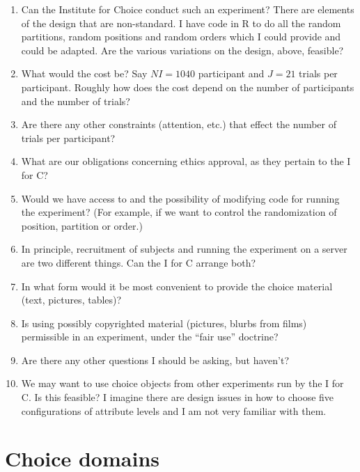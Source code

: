 \documentclass[11pt,letter]{amsart}
\begin{document}
\begin{enumerate}
\item Can the Institute for Choice conduct such an experiment?  There are
elements of the design that are non-standard.  I have code in R to do all
the random partitions, random positions and random orders which I could
provide and could be adapted.  Are the various variations on the design,
above, feasible? 

\item What would the cost be? Say $NI = 1040$ participant and $J=21$ trials
per participant.  Roughly how does the cost depend on the number of
participants and the number of trials? 

\item Are there any other constraints (attention, etc.) that effect the
number of trials per participant? 

\item What are our obligations concerning ethics approval, as they pertain
to the I for C? 

\item Would we have access to and the possibility of modifying code for
running the experiment? (For example, if we want to control the
randomization of position, partition or order.) 

\item In principle, recruitment of subjects and running the experiment on a
server are two different things. Can the I for C arrange both? 

\item In what form would it be most convenient to provide the choice
material (text, pictures, tables)? 

\item Is using possibly copyrighted material (pictures, blurbs from films)
permissible in an experiment, under the ``fair use'' doctrine? 

\item Are there any other questions I should be asking, but haven't? 

\item We may want to use choice objects from other experiments run by the I
for C.  Is this feasible? I imagine there are design issues in how to choose
five configurations of attribute levels and I am not very familiar with them.
\end{enumerate}

\section{Choice domains}
\end{document}
